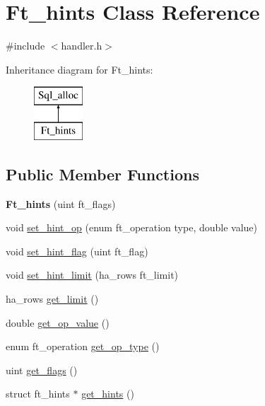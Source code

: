 \hypertarget{classFt__hints}{}\section{Ft\+\_\+hints Class Reference}
\label{classFt__hints}


{\ttfamily \#include $<$handler.\+h$>$}

Inheritance diagram for Ft\+\_\+hints\+:\begin{figure}[H]
\begin{center}
\leavevmode
\includegraphics[height=2.000000cm]{classFt__hints}
\end{center}
\end{figure}
\subsection*{Public Member Functions}
\begin{DoxyCompactItemize}
\item 
\mbox{\label{classFt__hints_a7b21c0e4150ad0d20a5f3f144318e55f}} 
{\bfseries Ft\+\_\+hints} (uint ft\+\_\+flags)
\item 
void \mbox{\hyperlink{classFt__hints_aa8807f96c74757666f35c315330cb28c}{set\+\_\+hint\+\_\+op}} (enum ft\+\_\+operation type, double value)
\item 
void \mbox{\hyperlink{classFt__hints_a12304b6a95cbd167360f07068fd5a81d}{set\+\_\+hint\+\_\+flag}} (uint ft\+\_\+flag)
\item 
void \mbox{\hyperlink{classFt__hints_aa86f02bd7c571cd622878774be4db5e2}{set\+\_\+hint\+\_\+limit}} (ha\+\_\+rows ft\+\_\+limit)
\item 
ha\+\_\+rows \mbox{\hyperlink{classFt__hints_a819422e6239fbed66d719670a417f242}{get\+\_\+limit}} ()
\item 
double \mbox{\hyperlink{classFt__hints_a047208adaf476b379520abcca21f49b4}{get\+\_\+op\+\_\+value}} ()
\item 
enum ft\+\_\+operation \mbox{\hyperlink{classFt__hints_add092343b5bc383cea0f277aa6c157d5}{get\+\_\+op\+\_\+type}} ()
\item 
uint \mbox{\hyperlink{classFt__hints_afc422006ae4edfc400ad6e84afca280b}{get\+\_\+flags}} ()
\item 
struct ft\+\_\+hints $\ast$ \mbox{\hyperlink{classFt__hints_a35d5cea0394840c738b26fae283fba71}{get\+\_\+hints}} ()
\end{DoxyCompactItemize}
